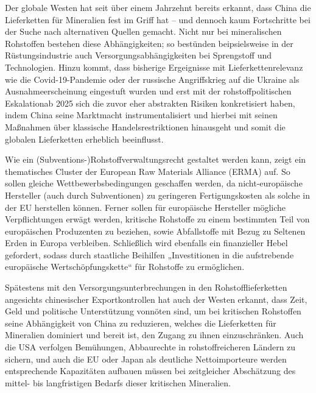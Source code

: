 \documentclass[12pt,a4paper,oneside]{book} %
\begin{document}
	Der globale Westen hat seit über einem Jahrzehnt bereits erkannt, dass China die Lieferketten für Mineralien fest im Griff hat -- und dennoch kaum Fortschritte bei der Suche nach alternativen Quellen gemacht. Nicht nur bei mineralischen Rohstoffen bestehen diese Abhängigkeiten; so bestünden beipsielsweise in der Rüstungsindustrie auch Versorgungsabhängigkeiten bei Sprengstoff und Technologien.\autocite{https://www.sz-dossier.de/tiefgaenge/die-grosse-schwachstelle-deutscher-und-europaeischer-ruestungsfirmen-a36cf978 , https://www.faz.net/aktuell/wirtschaft/unternehmen/ruestungsindustrie-rekordumsaetze-trotz-abhaengigkeit-von-china-110795132.html} Hinzu kommt, dass bisherige Ergeignisse mit Lieferkettenrelevanz wie die Covid-19-Pandemie oder der russische Angriffskrieg auf die Ukraine als Ausnahmeerscheinung eingestuft wurden und erst mit der \glqq rohstoffpolitischen Eskalation\grqq ab 2025 sich die zuvor eher abstrakten Risiken konkretisiert haben, indem China seine Marktmacht instrumentalisiert und hierbei mit seinen Maßnahmen über klassische Handelsrestriktionen hinausgeht und somit die globalen Lieferketten erheblich beeinflusst.\autocite{IW-Trends_2026-2-6_Neligan_et_al_Rohstoffe, S. 107} 
	
	Wie ein (Subventions-)Rohstoffverwaltungsrecht gestaltet werden kann, zeigt ein thematisches Cluster der European Raw Materials Alliance (ERMA) auf. So sollen gleiche Wettbewerbsbedingungen geschaffen werden, da nicht-europäische Hersteller (auch durch Subventionen) zu geringeren Fertigungskosten als solche in der EU herstellen können. Ferner sollen für europäische Hersteller mögliche Verpflichtungen erwägt werden, kritische Rohstoffe zu einem bestimmten Teil von europäischen Produzenten zu beziehen, sowie Abfallstoffe mit Bezug zu Seltenen Erden in Europa verbleiben. Schließlich wird ebenfalls ein finanzieller Hebel gefordert, sodass durch staatliche Beihilfen „Investitionen in die aufstrebende europäische Wertschöpfungskette“ für Rohstoffe zu ermöglichen.\autocite[7]{gaus_rare_2021}
	
	Spätestens mit den Versorgungsunterbrechungen in den Rohstofflieferketten angesichts chinesischer Exportkontrollen hat auch der Westen erkannt, dass Zeit, Geld und politische Unterstützung vonnöten sind, um bei kritischen Rohstoffen seine Abhängigkeit von China zu reduzieren, welches die Lieferketten für Mineralien dominiert und bereit ist, den Zugang zu ihnen einzuschränken. Auch die USA verfolgen Bemühungen, Abbaurechte in rohstoffreicheren Ländern zu sichern, und auch die EU oder Japan als deutliche Nettoimporteure werden entsprechende Kapazitäten aufbauen müssen bei zeitgleicher Abschätzung des mittel- bis langfristigen Bedarfs dieser kritischen Mineralien.
	
\end{document}
